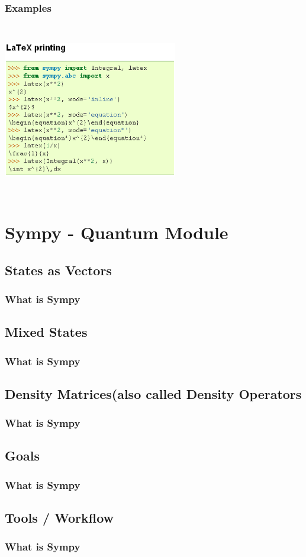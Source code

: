\documentclass[dvips]{beamer}
\begin{document}
\begin{frame}
\frametitle{Examples}
\includegraphics[height=3in,width=3in]{ex5.ps}
\end{frame}



\section{Sympy - Quantum Module}
\subsection { States as Vectors }
\begin{frame}
\frametitle{What is Sympy}
\end{frame}

\subsection { Mixed States }
\begin{frame}
\frametitle{What is Sympy}
\end{frame}

\subsection { Density Matrices(also called Density Operators}
\begin{frame}
\frametitle{What is Sympy}
\end{frame}

\subsection {  Goals }
\begin{frame}
\frametitle{What is Sympy}
\end{frame}

\subsection {  Tools / Workflow }
\begin{frame}
\frametitle{What is Sympy}
\end{frame}
\end{document}

